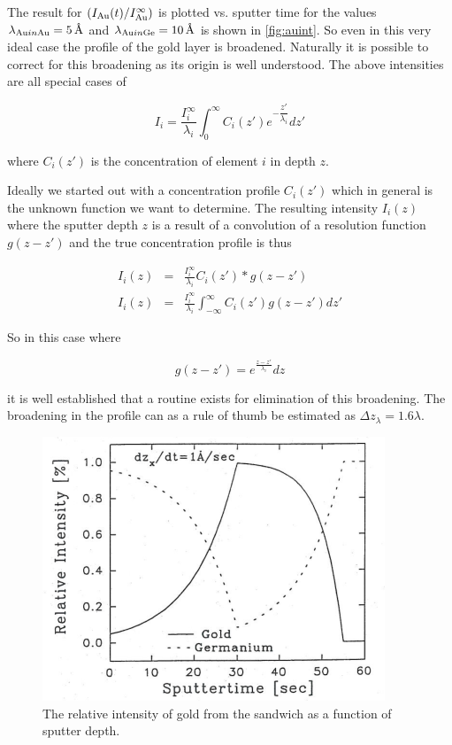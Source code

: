 The result for $(I_{\ce{Au}}(t)/I_{\ce{Au}}^{\infty})$ is plotted vs. sputter time for the values $\lambda_{\ce{Au} in \ce{Au}}=\SI{5}{\angstrom}$ and $\lambda_{\ce{Au} in \ce{Ge}}=\SI{10}{\angstrom}$ is shown in \autoref{fig:auint}. So even in this very ideal case the profile of the gold layer is broadened. Naturally it is possible to correct for this broadening as its origin is well understood. The above intensities are all special cases of

\begin{equation}
I_i=\frac{I^{\infty}_i}{\lambda_i}\int^{\infty}_0C_i(z\prime)e^{-\dfrac{z\prime}{\lambda_i}}dz\prime
\end{equation}

\noindent where $C_i(z\prime)$ is the concentration of element $i$ in depth $z$.

Ideally we started out with a concentration profile $C_i(z\prime)$ which in general is the unknown function we want to determine. The resulting intensity $I_i(z)$ where the sputter depth $z$ is a result of a convolution of a resolution function $g(z-z\prime)$ and the true concentration profile is thus

\begin{eqnarray}
I_i(z)	& =	& \frac{I^{\infty}_i}{\lambda_i}C_i(z\prime)*g(z-z')\\
I_i(z)	& =	& \frac{I^{\infty}_i}{\lambda_i} \int^{\infty}_{-\infty}C_i(z\prime)g(z-z\prime)dz\prime
\end{eqnarray}

So in this case where

\begin{equation}
g(z-z\prime)=e^{\frac{z-z\prime}{\lambda_i}}dz
\end{equation}

\noindent it is well established that a routine exists for elimination of this broadening. The broadening in the profile can as a rule of thumb be estimated as $\Delta z_{\lambda}=1.6\lambda$.

\begin{figure}[h!]
	\begin{center}
	\includegraphics[scale=3.5]{figures/07_05.png}
	\caption{The relative intensity of gold from the sandwich as a function of sputter depth.}
	\label{fig:auint}
	\end{center}
\end{figure}

